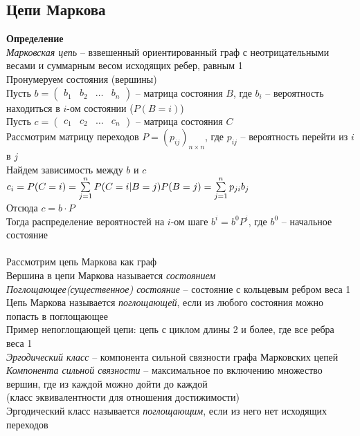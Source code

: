 \documentclass[12pt]{article}
\begin{document}
\subsection{Цепи Маркова}
\textbf{Определение}\\
\textit{Марковская цепь} -- взвешенный ориентированный граф с неотрицательными весами и суммарным весом исходящих ребер, равным 1\\
Пронумеруем состояния (вершины)\\
Пусть $b = \begin{pmatrix} b_1 & b_2 & \ldots & b_n \end{pmatrix}$ -- матрица состояния $B$, где $b_i$ -- вероятность находиться в $i$-ом состоянии ($P(B = i)$)\\
Пусть $c = \begin{pmatrix} c_1 & c_2 & \ldots & c_n \end{pmatrix}$ -- матрица состояния $C$\\
Рассмотрим матрицу переходов $P=(p_{ij})_{n\times n}$, где $p_{ij}$ -- вероятность перейти из $i$ в $j$\\
Найдем зависимость между $b$ и $c$\\
$c_i = P(C = i) = \sum\limits_{j=1}^n P(C=i|B=j)P(B=j) = \sum\limits_{j=1}^n p_{ji}b_j$\\
Отсюда $c = b \cdot P$\\
Тогда распределение вероятностей на $i$-ом шаге $b^i = b^0 P^i$, где $b^0$ -- начальное состояние\\\\
Рассмотрим цепь Маркова как граф\\
Вершина в цепи Маркова называется \textit{состоянием}\\
\textit{Поглощающее(существенное) состояние} -- состояние с кольцевым ребром веса 1\\
Цепь Маркова называется \textit{поглощающей}, если из любого состояния можно попасть в поглощающее\\
Пример непоглощающей цепи: цепь с циклом длины 2 и более, где все ребра веса 1\\
\textit{Эргодический класс} -- компонента сильной связности графа Марковских цепей\\
\textit{Компонента сильной связности} -- максимальное по включению множество вершин, где из каждой можно дойти до каждой\\
(класс эквивалентности для отношения достижимости)\\
Эргодический класс называется \textit{поглощающим}, если из него нет исходящих переходов\\
\end{document}
